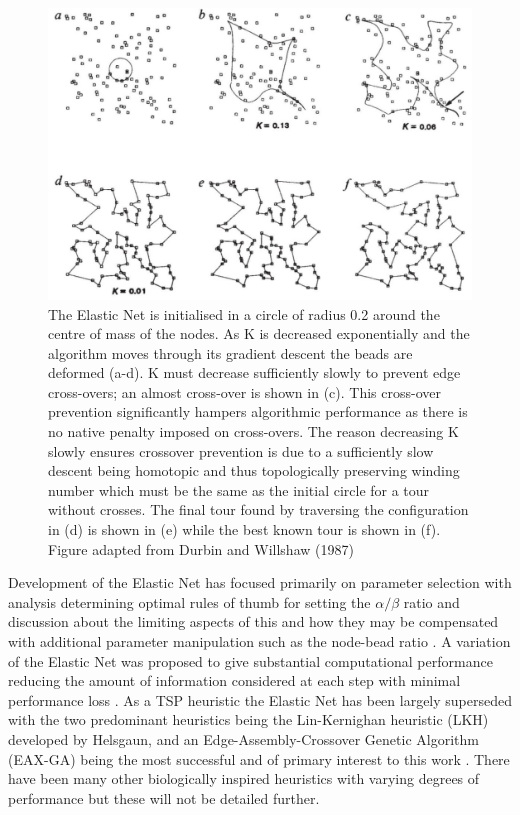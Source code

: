 \begin{figure}
	\centering
	\includegraphics[width=\textwidth]{images/introduction/elasticNetexample}
	\def\c{A description of the Elastic Net method for producing solutions to the Travelling Salesman Problem. }
	\caption[\c]{\label{fig:encartoon} The Elastic Net is initialised in a circle of radius 0.2 around the centre of mass of the nodes. As K is decreased exponentially and the algorithm moves through its gradient descent the beads are deformed (a-d). K must decrease sufficiently slowly to prevent edge cross-overs; an almost cross-over is shown in (c). This cross-over prevention significantly hampers algorithmic performance as there is no native penalty imposed on cross-overs. The reason decreasing K slowly ensures crossover prevention is due to a sufficiently slow descent being homotopic and thus topologically preserving winding number which must be the same as the initial circle for a tour without crosses. The final tour found by traversing the configuration in (d) is shown in (e) while the best known tour is shown in (f).  Figure adapted from Durbin and Willshaw (1987) \cite{Durbin1987-ki}}
\end{figure}

Development of the Elastic Net has focused primarily on parameter selection with analysis determining optimal rules of thumb for setting the $\alpha/\beta$ ratio and discussion about the limiting aspects of this and how they may be compensated with additional parameter manipulation such as the node-bead ratio \cite{Simmen1991-hm, Durbin1989-gs}. A variation of the Elastic Net was proposed to give substantial computational performance reducing the amount of information considered at each step with minimal performance loss \cite{Boeres1992-fo, Burr1988-fg}. As a TSP heuristic the Elastic Net has been largely superseded with the two predominant heuristics being the Lin-Kernighan heuristic (LKH) developed by Helsgaun, and an Edge-Assembly-Crossover Genetic Algorithm (EAX-GA) being the most successful and of primary interest to this work \cite{Honda2013-ri, Nagata2013-we, Lin1973-pt, Helsgaun2009-dl}. There have been many other biologically inspired heuristics with varying degrees of performance but these will not be detailed further.  


